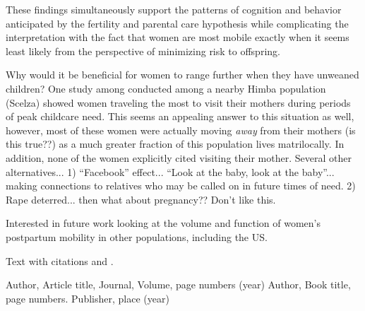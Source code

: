 These findings simultaneously support the patterns of cognition and behavior anticipated by the fertility and parental care hypothesis while complicating the interpretation with the fact that women are most mobile exactly when it seems least likely from the perspective of minimizing risk to offspring.

Why would it be beneficial for women to range further when they have unweaned children?  One study among conducted among a nearby  Himba population (Scelza) showed women traveling the most to visit their mothers during periods of peak childcare need.  This seems an appealing answer to this situation as well, however, most of these women were actually moving \emph{away} from their mothers (is this true??) as a much greater fraction of this population lives matrilocally.  In addition, none of the women explicitly cited visiting their mother.  Several other alternatives... 1) ``Facebook'' effect...  ``Look at the baby, look at the baby''... making connections to relatives who may be called on in future times of need.  2) Rape deterred... then what about pregnancy??  Don't like this.

Interested in future work looking at the volume and function of women's postpartum mobility in other populations, including the US.


Text with citations \cite{RefB} and \cite{RefJ}.





\begin{thebibliography}{}
%
%
Author, Article title, Journal, Volume, page numbers (year)
Author, Book title, page numbers. Publisher, place (year)
\end{thebibliography}



